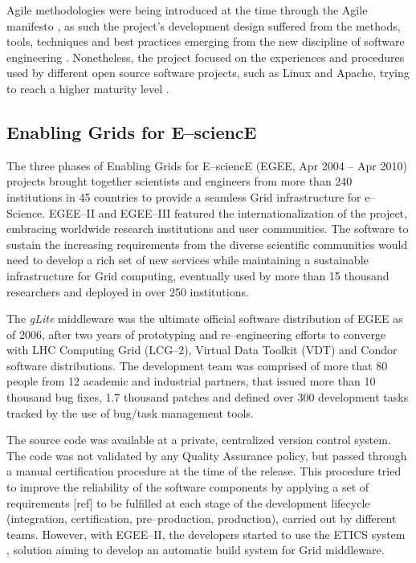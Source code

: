 \documentclass[journal]{IEEEtran}
\begin{document}
Agile methodologies were being introduced at the time
through the Agile manifesto \cite{agile-manifesto}, as such the project's
development design suffered from the methods, tools, techniques and best
practices emerging from the new discipline of software engineering
\cite{agile}. Nonetheless, the project focused on the experiences and procedures
used by different open source software projects, such as Linux and Apache, trying to reach a
higher maturity level \cite{cmm}.

\subsection{Enabling Grids for E--sciencE}

The three phases of Enabling Grids for E--sciencE (EGEE, Apr 2004 -- Apr 2010)
\cite{cordis:egee, cordis:egee2, cordis:egee3} projects brought together
scientists and engineers from more than 240 institutions in 45 countries to
provide a seamless Grid infrastructure for e--Science. EGEE--II and EGEE--III
featured the internationalization of the project, embracing worldwide research
institutions and user communities. The software to sustain the increasing
requirements from the diverse scientific communities would need to develop a
rich set of new services while maintaining a sustainable infrastructure for
Grid computing, eventually used by more than 15 thousand researchers and deployed in
over 250 institutions.

The {\sl gLite} middleware \cite{glite} was the ultimate
official software distribution of EGEE as of 2006, after two years of prototyping and
re--engineering efforts to converge with LHC Computing Grid (LCG--2), Virtual
Data Toolkit (VDT) and Condor \cite{condor} software distributions. The
development team was comprised of more that 80 people from 12 academic and
industrial partners, that issued more than 10 thousand bug fixes, 1.7 thousand patches and
defined over 300 development tasks tracked by the use of bug/task management tools.

The source code was available at a private, centralized version control system.
The code was not validated by any Quality Assurance policy, but passed through a manual
certification procedure at the time of the release. This procedure tried to
improve the reliability of the software components by applying a set of
requirements [ref] to be fulfilled at each stage of the  development lifecycle (integration, certification,
pre--production, production), carried out by different teams. However, with 
EGEE--II, the developers started to use the ETICS system \cite{etics}, solution aiming to develop
an automatic build system for Grid middleware.
\end{document}
